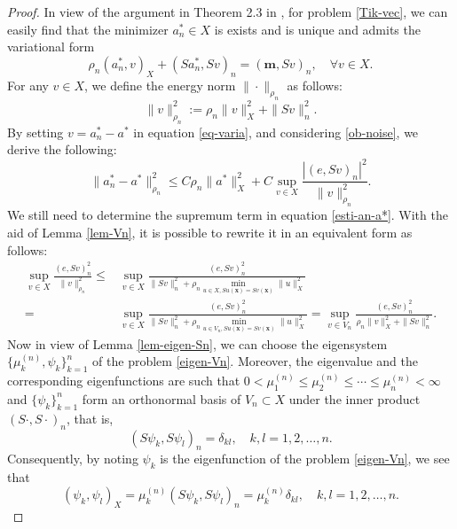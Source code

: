 \documentclass[11pt]{article}
\numberwithin{equation}{section}
\begin{document}
\begin{proof}
In view of the argument in Theorem 2.3 in \cite{chen2022stochastic}, for problem \eqref{Tik-vec}, we can easily find that the minimizer $a_n^* \in X$ is exists and is unique and admits the variational form
\begin{equation}\label{eq-varia}
\rho_n (a_n^*, v)_X + (Sa_n^*, Sv)_n = (\mathbf{m}, Sv)_n, \quad \forall v \in X.
\end{equation}
For any $v \in X$, we define the energy norm $\| \cdot \|_{\rho_n}$ as follows:
$$
\| v \|_{\rho_n}^2 := \rho_n \|v\|_X^2 + \| Sv \|_n^2.
$$
By setting $v = a_n^* - a^*$ in equation \eqref{eq-varia}, and considering \eqref{ob-noise}, we derive the following:
\begin{equation}\label{esti-an-a*}
\| a_n^* - a^* \|_{\rho_n}^2 \leq C\rho_n \| a^* \|_X^2 + C\sup_{v \in X} \frac{|(e, Sv)_n|^2}{\| v \|_{\rho_n}^2}.
\end{equation}
We still need to determine the supremum term in equation \eqref{esti-an-a*}. With the aid of Lemma \ref{lem-Vn}, it is possible to rewrite it in an equivalent form as follows:
$$
\begin{aligned}
  \sup_{v \in X} \frac{(e, Sv)_n^2}{\| v \|_{\rho_n}^2}
  \leq& \sup_{v \in X} \frac{(e, Sv)_n^2}{\| Sv \|_n^2 + \rho_n \min_{u \in X, Su(\mathbf{x}) = Sv(\mathbf{x})} \|u\|_X^2 }
  \\
  =& \sup_{v \in X} \frac{(e, Sv)_n^2}{\| Sv \|_n^2 + \rho_n \min_{u \in V_n, Su(\mathbf{x}) = Sv(\mathbf{x})} \|u\|_X^2 }
=  \sup_{v \in V_n} \frac{(e, Sv)_n^2}{\rho_n  \|v\|_X^2 + \| Sv \|_n^2}.
\end{aligned}
$$
Now in view of Lemma \ref{lem-eigen-Sn}, we can choose the eigensystem $\{\mu_k^{(n)}, \psi_k\}_{k=1}^n$ of the problem  \eqref{eigen-Vn}. Moreover, the eigenvalue and the corresponding eigenfunctions are such that $0<\mu_1^{(n)} \leq \mu_2^{(n)} \leq \cdots \leq \mu_n^{(n)}<\infty$ and $\{\psi_k\}_{k=1}^n$ form an orthonormal basis of $V_n\subset X$ under the inner product $(S \cdot, S \cdot)_n$, that is,
\begin{equation}\label{eq-SkSl}
(S\psi_k, S\psi_l)_n = \delta_{kl}, \quad k, l = 1, 2, \ldots, n.
\end{equation}
Consequently, by noting $\psi_k$ is the eigenfunction of the problem \eqref{eigen-Vn}, we see that
\begin{equation}
    \label{eq-pkpl}
(\psi_k, \psi_l)_X=\mu_k^{(n)} (S\psi_k,S\psi_l)_n = \mu_k^{(n)} \delta_{kl}, \quad k, l = 1, 2, \ldots, n.
\end{equation}

\end{proof}
\end{document}
